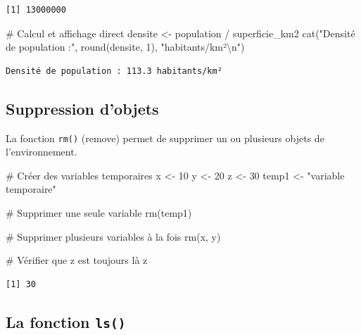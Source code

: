 \documentclass[
  french,
  11pt,
  a4paper,
]{article}
\newenvironment{Shaded}{}{}
\newcommand{\CommentTok}[1]{\textcolor[rgb]{0.42,0.45,0.49}{#1}}
\newcommand{\DecValTok}[1]{\textcolor[rgb]{0.00,0.36,0.77}{#1}}
\newcommand{\FunctionTok}[1]{\textcolor[rgb]{0.44,0.26,0.76}{#1}}
\newcommand{\NormalTok}[1]{\textcolor[rgb]{0.14,0.16,0.18}{#1}}
\newcommand{\OtherTok}[1]{\textcolor[rgb]{0.44,0.26,0.76}{#1}}
\newcommand{\SpecialCharTok}[1]{\textcolor[rgb]{0.00,0.36,0.77}{#1}}
\newcommand{\StringTok}[1]{\textcolor[rgb]{0.01,0.18,0.38}{#1}}
\begin{document}
\begin{verbatim}
[1] 13000000
\end{verbatim}

\begin{Shaded}
\begin{Highlighting}[]
\CommentTok{\# Calcul et affichage direct}
\NormalTok{densite }\OtherTok{\textless{}{-}}\NormalTok{ population }\SpecialCharTok{/}\NormalTok{ superficie\_km2}
\FunctionTok{cat}\NormalTok{(}\StringTok{"Densité de population :"}\NormalTok{, }\FunctionTok{round}\NormalTok{(densite, }\DecValTok{1}\NormalTok{), }\StringTok{"habitants/km²}\SpecialCharTok{\textbackslash{}n}\StringTok{"}\NormalTok{)}
\end{Highlighting}
\end{Shaded}

\begin{verbatim}
Densité de population : 113.3 habitants/km²
\end{verbatim}

\subsection{Suppression d'objets}\label{suppression-dobjets}

La fonction \texttt{rm()} (remove) permet de supprimer un ou plusieurs
objets de l'environnement.

\begin{Shaded}
\begin{Highlighting}[]
\CommentTok{\# Créer des variables temporaires}
\NormalTok{x }\OtherTok{\textless{}{-}} \DecValTok{10}
\NormalTok{y }\OtherTok{\textless{}{-}} \DecValTok{20}
\NormalTok{z }\OtherTok{\textless{}{-}} \DecValTok{30}
\NormalTok{temp1 }\OtherTok{\textless{}{-}} \StringTok{"variable temporaire"}

\CommentTok{\# Supprimer une seule variable}
\FunctionTok{rm}\NormalTok{(temp1)}

\CommentTok{\# Supprimer plusieurs variables à la fois}
\FunctionTok{rm}\NormalTok{(x, y)}

\CommentTok{\# Vérifier que z est toujours là}
\NormalTok{z}
\end{Highlighting}
\end{Shaded}

\begin{verbatim}
[1] 30
\end{verbatim}

\subsection{\texorpdfstring{La fonction
\texttt{ls()}}{La fonction ls()}}\label{la-fonction-ls}
\end{document}
